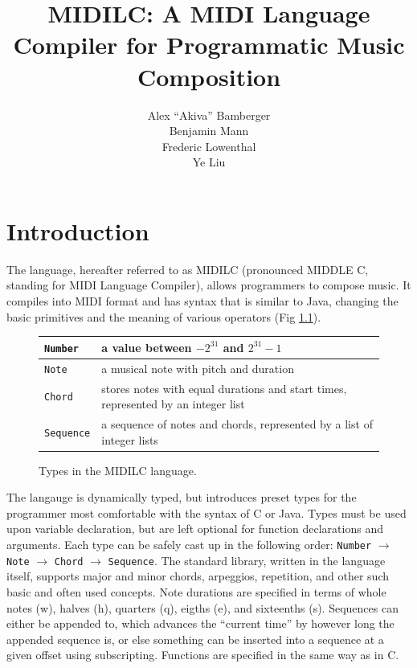 \documentclass[12pt,A4]{book}
\title{MIDILC:  A MIDI Language Compiler for Programmatic Music Composition}
\author{Alex ``Akiva'' Bamberger \\ Benjamin Mann \\ Frederic Lowenthal \\ Ye Liu}
\date{}
\begin{document}
\maketitle
\newpage
\tableofcontents
\newpage

\chapter{Introduction}
The language, hereafter referred to as MIDILC (pronounced MIDDLE C, standing for MIDI
Language Compiler), allows programmers to compose music. It compiles into MIDI format and
has syntax that is similar to Java, changing the basic primitives and the meaning of various
operators (Fig \ref{fig:types_in_midilc}).

\begin{figure}
\center
\begin{tabular}{|p{}|p{}|}
\hline
\verb|Number| & a value between $-2^{31}$ and $2^{31}-1$\\ \hline
\verb|Note| & a musical note with pitch and duration \\ \hline
\verb|Chord| & stores notes with equal durations and start times, represented by an integer list \\ \hline
\verb|Sequence| & a sequence of notes and chords, represented by a list of integer lists \\ \hline
\end{tabular}
\caption{Types in the MIDILC language. }
\label{fig:types_in_midilc}
\end{figure}

The langauge is dynamically typed, but introduces preset types for the programmer most comfortable with the syntax of C or Java. Types must be used upon variable declaration, but are left optional for function declarations and arguments. Each type can be safely cast up in the following order: \verb|Number| $\rightarrow$ \verb|Note| $\rightarrow$ \verb|Chord| $\rightarrow$ \verb|Sequence|. The standard library, written in the language itself, supports major and minor chords, arpeggios, repetition, and other such basic and often used concepts. Note durations are specified in terms of whole notes (w), halves (h), quarters (q), eigths (e), and sixteenths (s). Sequences can either be appended to, which advances the ``current time'' by however long the appended sequence is, or else something can be inserted into a sequence at a given offset using subscripting. Functions are specified in the same way as in C.
\end{document}
